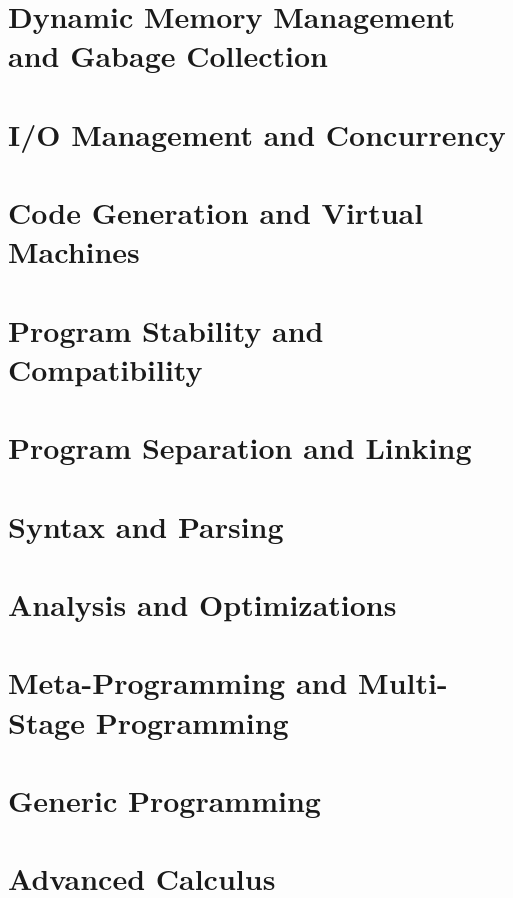 \documentclass[
  dvipdfmx,
  uplatex,
  japanese,
  titlepage
]{jsbook}
\begin{document}
\chapter{Dynamic Memory Management and Gabage Collection}

\chapter{I/O Management and Concurrency}

\chapter{Code Generation and Virtual Machines}

\chapter{Program Stability and Compatibility}

\chapter{Program Separation and Linking}

\chapter{Syntax and Parsing}

\chapter{Analysis and Optimizations}

\chapter{Meta-Programming and Multi-Stage Programming}

\chapter{Generic Programming}

\chapter{Advanced Calculus}



\end{document}
